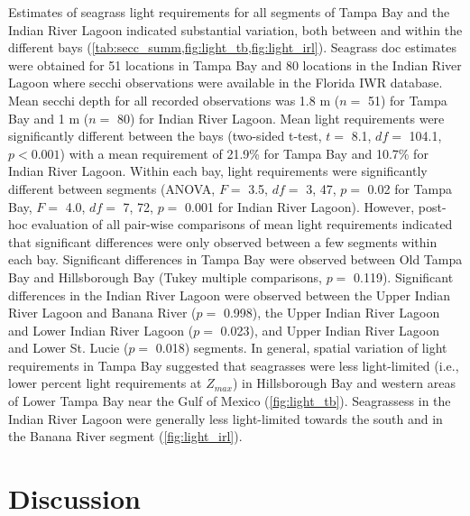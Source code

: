 \documentclass[letterpaper,12pt,oneside]{article}\usepackage[]{graphicx}\usepackage[]{color}
\begin{document}
Estimates of seagrass light requirements for all segments of Tampa Bay and the Indian River Lagoon indicated substantial variation, both between and within the different bays (\cref{tab:secc_summ,fig:light_tb,fig:light_irl}).  Seagrass \ac{doc} estimates were obtained for 51 locations in Tampa Bay and 80 locations in the Indian River Lagoon where secchi observations were available in the Florida \ac{IWR} database.  Mean secchi depth for all recorded observations was 1.8 m ($n=$ 51) for Tampa Bay and 1 m ($n=$ 80) for Indian River Lagoon.  Mean light requirements were significantly different between the bays (two-sided t-test, $t=$ 8.1, $df=$ 104.1, $p < 0.001$) with a mean requirement of 21.9\% for Tampa Bay and 10.7\% for Indian River Lagoon.  Within each bay, light requirements were significantly different between segments (ANOVA, $F =$ 3.5, $df =$ 3, 47, $p = $ 0.02 for Tampa Bay, $F =$ 4.0, $df =$ 7, 72, $p = $ 0.001 for Indian River Lagoon).  However, post-hoc evaluation of all pair-wise comparisons of mean light requirements indicated that significant differences were only observed between a few segments within each bay.  Significant differences in Tampa Bay were observed between Old Tampa Bay and Hillsborough Bay (Tukey multiple comparisons, $p =$ 0.119).  Significant differences in the Indian River Lagoon were observed between the Upper Indian River Lagoon and Banana River ($p =$ 0.998), the Upper Indian River Lagoon and Lower Indian River Lagoon ($p =$ 0.023), and Upper Indian River Lagoon and Lower St. Lucie ($p =$ 0.018) segments.  In general, spatial variation of light requirements in Tampa Bay suggested that seagrasses were less light-limited (i.e., lower percent light requirements at $Z_{max}$) in Hillsborough Bay and western areas of Lower Tampa Bay near the Gulf of Mexico (\cref{fig:light_tb}).  Seagrassess in the Indian River Lagoon were generally less light-limited towards the south and in the Banana River segment (\cref{fig:light_irl}).

\section{Discussion}



\end{document}
